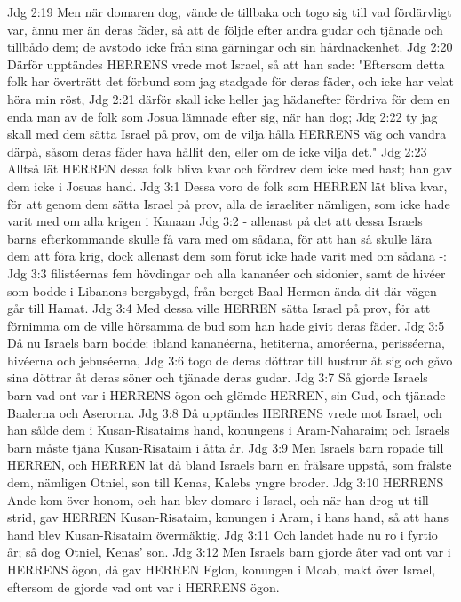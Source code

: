 Jdg 2:19  Men när domaren dog, vände de tillbaka och togo sig till vad fördärvligt var, ännu mer än deras fäder, så att de följde efter andra gudar och tjänade och tillbådo dem; de avstodo icke från sina gärningar och sin hårdnackenhet.
Jdg 2:20  Därför upptändes HERRENS vrede mot Israel, så att han sade: "Eftersom detta folk har överträtt det förbund som jag stadgade för deras fäder, och icke har velat höra min röst,
Jdg 2:21  därför skall icke heller jag hädanefter fördriva för dem en enda man av de folk som Josua lämnade efter sig, när han dog;
Jdg 2:22  ty jag skall med dem sätta Israel på prov, om de vilja hålla HERRENS väg och vandra därpå, såsom deras fäder hava hållit den, eller om de icke vilja det."
Jdg 2:23  Alltså lät HERREN dessa folk bliva kvar och fördrev dem icke med hast; han gav dem icke i Josuas hand.
Jdg 3:1  Dessa voro de folk som HERREN lät bliva kvar, för att genom dem sätta Israel på prov, alla de israeliter nämligen, som icke hade varit med om alla krigen i Kanaan
Jdg 3:2  - allenast på det att dessa Israels barns efterkommande skulle få vara med om sådana, för att han så skulle lära dem att föra krig, dock allenast dem som förut icke hade varit med om sådana -:
Jdg 3:3  filistéernas fem hövdingar och alla kananéer och sidonier, samt de hivéer som bodde i Libanons bergsbygd, från berget Baal-Hermon ända dit där vägen går till Hamat.
Jdg 3:4  Med dessa ville HERREN sätta Israel på prov, för att förnimma om de ville hörsamma de bud som han hade givit deras fäder.
Jdg 3:5  Då nu Israels barn bodde: ibland kananéerna, hetiterna, amoréerna, perisséerna, hivéerna och jebuséerna,
Jdg 3:6  togo de deras döttrar till hustrur åt sig och gåvo sina döttrar åt deras söner och tjänade deras gudar.
Jdg 3:7  Så gjorde Israels barn vad ont var i HERRENS ögon och glömde HERREN, sin Gud, och tjänade Baalerna och Aserorna.
Jdg 3:8  Då upptändes HERRENS vrede mot Israel, och han sålde dem i Kusan-Risataims hand, konungens i Aram-Naharaim; och Israels barn måste tjäna Kusan-Risataim i åtta år.
Jdg 3:9  Men Israels barn ropade till HERREN, och HERREN lät då bland Israels barn en frälsare uppstå, som frälste dem, nämligen Otniel, son till Kenas, Kalebs yngre broder.
Jdg 3:10  HERRENS Ande kom över honom, och han blev domare i Israel, och när han drog ut till strid, gav HERREN Kusan-Risataim, konungen i Aram, i hans hand, så att hans hand blev Kusan-Risataim övermäktig.
Jdg 3:11  Och landet hade nu ro i fyrtio år; så dog Otniel, Kenas' son.
Jdg 3:12  Men Israels barn gjorde åter vad ont var i HERRENS ögon, då gav HERREN Eglon, konungen i Moab, makt över Israel, eftersom de gjorde vad ont var i HERRENS ögon.

